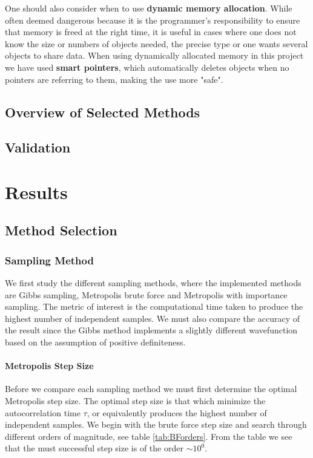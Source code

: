 \documentclass[twoside,english]{uiofysmaster}
\begin{document}
One should also consider when to use \textbf{dynamic memory allocation}. While often deemed dangerous because it is the programmer's responsibility to ensure that memory is freed at the right time, it is useful in cases where one does not know the size or numbers of objects needed, the precise type or one wants several objects to share data. When using dynamically allocated memory in this project we have used \textbf{smart pointers}, which automatically deletes objects when no pointers are referring to them, making the use more "safe".


\section{Overview of Selected Methods}


\section{Validation}








\chapter{Results}

\section{Method Selection}

\subsection{Sampling Method}
We first study the different sampling methods, where the implemented methods are Gibbs sampling, Metropolis brute force and Metropolis with importance sampling. The metric of interest is the computational time taken to produce the highest number of independent samples. We must also compare the accuracy of the result since the Gibbs method implements a slightly different wavefunction based on the assumption of positive definiteness. 

\subsubsection{Metropolis Step Size}
Before we compare each sampling method we must first determine the optimal Metropolis step size. The optimal step size is that which minimize the autocorrelation time $\tau$, or equivalently produces the highest number of independent samples. We begin with the brute force step size and search through different orders of magnitude, see table \ref{tab:BForders}. From the table we see that the must successful step size is of the order $\sim 10^0$. 
\end{document}
